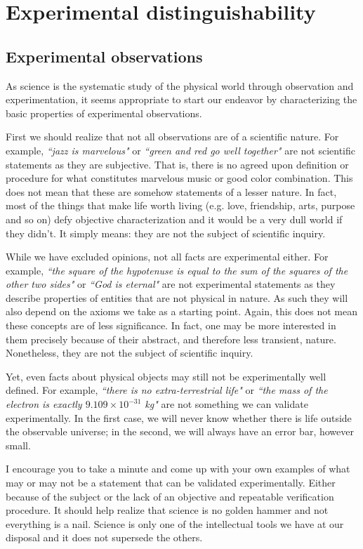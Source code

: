 \documentclass[11pt,letterpaper,fleqn]{memoir} %
\begin{document}
	
\chapter{Experimental distinguishability}

\section{Experimental observations}

As science is the systematic study of the physical world through observation and experimentation, it seems appropriate to start our endeavor by characterizing the basic properties of experimental observations.

First we should realize that not all observations are of a scientific nature. For example, \emph{``jazz is marvelous"} or \emph{``green and red go well together"} are not scientific statements as they are subjective. That is, there is no agreed upon definition or procedure for what constitutes marvelous music or good color combination. This does not mean that these are somehow statements of a lesser nature. In fact, most of the things that make life worth living (e.g. love, friendship, arts, purpose and so on) defy objective characterization and it would be a very dull world if they didn't. It simply means: they are not the subject of scientific inquiry.

While we have excluded opinions, not all facts are experimental either. For example, \emph{``the square of the hypotenuse is equal to the sum of the squares of the other two sides"} or \emph{``God is eternal"} are not experimental statements as they describe properties of entities that are not physical in nature. As such they will also depend on the axioms we take as a starting point. Again, this does not mean these concepts are of less significance. In fact, one may be more interested in them precisely because of their abstract, and therefore less transient, nature. Nonetheless, they are not the subject of scientific inquiry.

Yet, even facts about physical objects may still not be experimentally well defined. For example, \emph{``there is no extra-terrestrial life"} or \emph{``the mass of the electron is exactly $9.109 \times 10^{-31}$ kg"} are not something we can validate experimentally. In the first case, we will never know whether there is life outside the observable universe; in the second, we will always have an error bar, however small.

I encourage you to take a minute and come up with your own examples of what may or may not be a statement that can be validated experimentally. Either because of the subject or the lack of an objective and repeatable verification procedure. It should help realize that science is no golden hammer and not everything is a nail. Science is only one of the intellectual tools we have at our disposal and it does not supersede the others.
\end{document}
